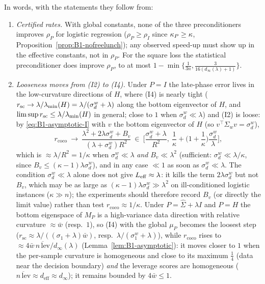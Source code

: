 In words, with the statements they follow from:
\begin{enumerate}[label=(P\arabic*)]
\item \emph{Certified rates.} With global constants, none of the three preconditioners improves $\rho_P$
for logistic regression ($\rho_P\ge\rho_I$ since $\kappa_P\ge\kappa$, Proposition~\ref{prop:B1-nofreelunch});
any observed speed-up must show up in the
effective constants, not in $\rho_P$. For the square loss the statistical preconditioner does improve
$\rho_P$, to at most $1-\min\{\frac1{3n},\frac{3}{16(d_\infty(\lambda)+1)}\}$.
\item \emph{Looseness moves from (I2) to (I4).} Under $P=I$ the late-phase error lives in the
low-curvature directions of $H$, where (I4) is nearly tight
($r_{\mathrm{sc}}\to\lambda/\lambda_{\min}(H)=\lambda/(\sigma^w_d+\lambda)$ along the bottom eigenvector of $H$, and
$\limsup r_{\mathrm{sc}}\le\lambda/\lambda_{\min}(H)$ in general; close to $1$ when $\sigma^w_d\ll\lambda$)
and (I2) is loose: by \eqref{eq:B1-asymptotic-I} with $v$ the bottom eigenvector of $H$ (so
$v^\top\hat\Sigma_wv=\sigma^w_d$),
\[
r_{\mathrm{coco}}\ \to\ \frac{\lambda^2+2\lambda\sigma^w_d+B_v}{(\lambda+\sigma^w_d)R^2}
\ \in\ \Big[\frac{\sigma^w_d+\lambda}{R^2},\ \frac1\kappa+\Big(1+\frac1\kappa\Big)\frac{\sigma^w_d}{\lambda}\Big],
\]
which is $\approx\lambda/R^2=1/\kappa$ when $\sigma^w_d\ll\lambda$ \emph{and} $B_v\ll\lambda^2$ (sufficient:
$\sigma^w_d\ll\lambda/\kappa$, since $B_v\le(\kappa-1)\lambda\sigma^w_d$), and in any case $\ll1$ as soon as
$\sigma^w_d\ll\lambda$. The condition $\sigma^w_d\ll\lambda$ alone does not give $L_{\mathrm{eff}}\approx\lambda$: it
kills the term $2\lambda\sigma^w_d$ but not $B_v$, which may be as large as
$(\kappa-1)\lambda\sigma^w_d\gg\lambda^2$ on ill-conditioned logistic instances ($\kappa\gg n$); the experiments should
therefore record $B_v$ (or directly the limit value) rather than test $r_{\mathrm{coco}}\approx1/\kappa$.
Under $P=\hat\Sigma+\lambda I$ and $P=H$ the bottom eigenspace
of $M_P$ is a high-variance data direction with relative curvature $\approx\bar w$ (resp.\ $1$), so (I4)
with the global $\mu_P$ becomes the loosest step ($r_{\mathrm{sc}}\approx\lambda/((\sigma_1+\lambda)\bar w)$,
resp.\ $\lambda/(\sigma_1^w+\lambda)$), while $r_{\mathrm{coco}}$ rises to $\approx4\bar w\,\overline{n\,\mathrm{lev}}/d_\infty(\lambda)$
(Lemma~\ref{lem:B1-asymptotic}): it moves closer to $1$ when the per-sample curvature is homogeneous and
close to its maximum $\frac14$ (data near the decision boundary) \emph{and} the leverage scores are
homogeneous ($\overline{n\,\mathrm{lev}}\approx d_{\mathrm{eff}}\approx d_\infty$); it remains bounded by $4\bar w\le1$.

\end{enumerate}
